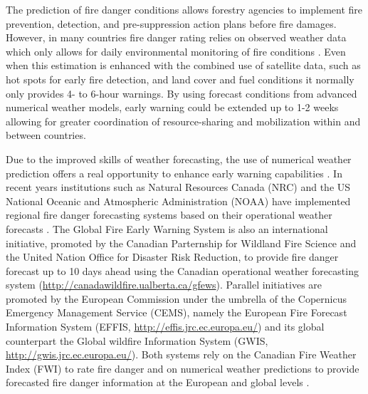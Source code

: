 \documentclass[, manuscript]{copernicus}
\begin{document}
\introduction

The prediction of fire danger conditions allows forestry agencies to
implement fire prevention, detection, and pre-suppression action plans
before fire damages. However, in many countries fire danger rating
relies on observed weather data which only allows for daily
environmental monitoring of fire conditions \citep{taylor:06}. Even when
this estimation is enhanced with the combined use of satellite data,
such as hot spots for early fire detection, and land cover and fuel
conditions it normally only provides 4- to 6-hour warnings. By using
forecast conditions from advanced numerical weather models, early
warning could be extended up to 1-2 weeks allowing for greater
coordination of resource-sharing and mobilization within and between
countries.

Due to the improved skills of weather forecasting, the use of numerical
weather prediction offers a real opportunity to enhance early warning
capabilities \citep{roads:05,molders:08,molders:10}. In recent years
institutions such as Natural Resources Canada (NRC) and the US National
Oceanic and Atmospheric Administration (NOAA) have implemented regional
fire danger forecasting systems based on their operational weather
forecasts \citep{bedia:18}. The Global Fire Early Warning System is also
an international initiative, promoted by the Canadian Parternship for
Wildland Fire Science and the United Nation Office for Disaster Risk
Reduction, to provide fire danger forecast up to 10 days ahead using the
Canadian operational weather forecasting system
(\url{http://canadawildfire.ualberta.ca/gfews}). Parallel initiatives
are promoted by the European Commission under the umbrella of the
Copernicus Emergency Management Service (CEMS), namely the European Fire
Forecast Information System (EFFIS,
\url{http://effis.jrc.ec.europa.eu/}) and its global counterpart the
Global wildfire Information System (GWIS,
\url{http://gwis.jrc.ec.europa.eu/}). Both systems rely on the Canadian
Fire Weather Index (FWI) \citep{vanwagner:74,vanwagner:85} to rate fire
danger and on numerical weather predictions to provide forecasted fire
danger information at the European and global levels
\citep{sanmiguel:02}.
\end{document}
